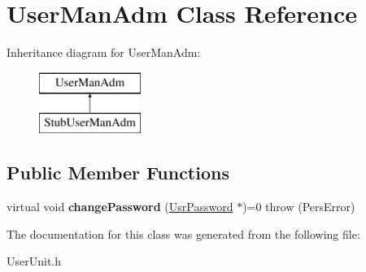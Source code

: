 \hypertarget{classUserManAdm}{\section{User\-Man\-Adm Class Reference}
\label{da/d86/classUserManAdm}
}
Inheritance diagram for User\-Man\-Adm\-:\begin{figure}[H]
\begin{center}
\leavevmode
\includegraphics[height=2.000000cm]{da/d86/classUserManAdm}
\end{center}
\end{figure}
\subsection*{Public Member Functions}
\begin{DoxyCompactItemize}
\item 
\hypertarget{classUserManAdm_a75006ea396a6384bbf47918fe9316bce}{virtual void {\bfseries change\-Password} (\hyperlink{classUsrPassword}{Usr\-Password} $\ast$)=0  throw (\-Pers\-Error)}\label{da/d86/classUserManAdm_a75006ea396a6384bbf47918fe9316bce}

\end{DoxyCompactItemize}


The documentation for this class was generated from the following file\-:\begin{DoxyCompactItemize}
\item 
User\-Unit.\-h\end{DoxyCompactItemize}
